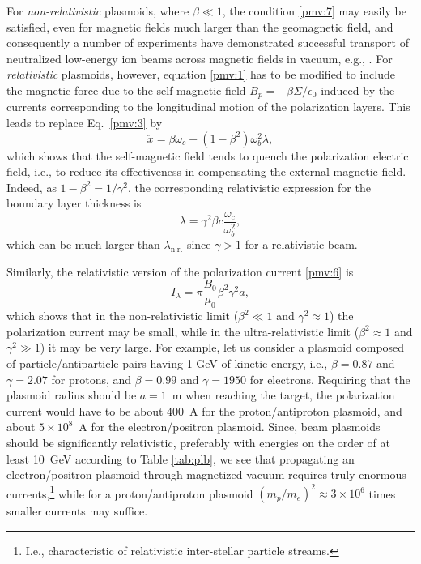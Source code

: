\documentclass [12pt,a4paper,     ]{report} %
\begin{document}
  For \emph{non-relativistic} plasmoids, where $\beta \ll 1$, the condition \eqref{pmv:7} may easily be satisfied, even for magnetic fields much larger than the geomagnetic field, and consequently a number of experiments have demonstrated successful transport of neutralized low-energy ion beams across magnetic fields in vacuum, e.g., \cite{ROBER1981-,ISHIZ1982-, ZHANG1989-, BRENN2005-}.  For \emph{relativistic} plasmoids, however, equation \eqref{pmv:1} has to be modified to include the magnetic force due to the self-magnetic field $B_p=-\beta \Sigma/\epsilon_0$ induced by the currents corresponding to the longitudinal motion of the polarization layers.  This leads to replace Eq.~\eqref{pmv:3} by
%
\begin{equation}\label{pmv:8} 
         \ddot x = \beta \omega_c - (1-\beta^2) \omega_b^2 \lambda,
\end{equation}
%
which shows that the self-magnetic field tends to quench the polarization electric field, i.e., to reduce its effectiveness in compensating the external magnetic field.  Indeed, as $1-\beta^2 = 1/\gamma^2$, the corresponding relativistic expression for the boundary layer thickness is
%
\begin{equation}\label{pmv:9} 
    \lambda = \gamma^2\beta c \frac{\omega_c}{\omega_b^2},
\end{equation}
%
which can be much larger than $\lambda_{\text{n.r.}}$ since $\gamma > 1$ for a relativistic beam.

   Similarly, the relativistic version of the polarization current \eqref{pmv:6} is
%
\begin{equation}\label{pmv:10} 
         I_{\lambda} = \pi \frac{B_0}{\mu_0} \beta^2 \gamma^2 a,
\end{equation}
%
which shows that in the non-relativistic limit ($\beta^2 \ll 1$ and $\gamma^2 \approx 1$) the polarization current may be small, while in the ultra-relativistic limit ($\beta^2 \approx 1$ and $\gamma^2 \gg 1$) it may be very large.  For example, let us consider a plasmoid composed of particle/antiparticle pairs having 1 GeV of kinetic energy, i.e., $\beta=0.87$ and $\gamma=2.07$ for protons, and $\beta=0.99$ and $\gamma=1950$ for electrons. Requiring that the plasmoid radius should be $a =1$~m when reaching the target, the polarization current would have to be about 400~A for the proton/antiproton plasmoid, and about $5 \times 10^8$~A for the electron/positron plasmoid.  Since, beam plasmoids should be significantly relativistic, preferably with energies on the order of at least 10~GeV according to Table \ref{tab:plb}, we see that propagating an electron/positron plasmoid through magnetized vacuum requires truly enormous currents,\footnote{I.e., characteristic of relativistic inter-stellar particle streams.} while for a proton/antiproton plasmoid $(m_p/m_e)^2\approx 3 \times 10^6$ times smaller currents may suffice. 
\end{document}
